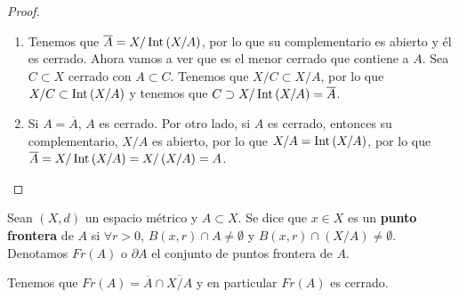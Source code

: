 \begin{proof}
\begin{enumerate}
\item Tenemos que $\displaystyle \overline{A} = X/\operatorname{Int}\left(X/A\right) $, por lo que su complementario es abierto y él es cerrado. Ahora vamos a ver que es el menor cerrado que contiene a $\displaystyle A $. Sea $\displaystyle C \subset X $ cerrado con $\displaystyle A \subset C $. Tenemos que $\displaystyle X/C \subset X/A $, por lo que $\displaystyle X/C \subset \operatorname{Int}\left(X/A\right) $ y tenemos que $\displaystyle C \supset X/\operatorname{Int}\left(X/A\right) = \overline{A} $.
\item Si $\displaystyle A = \overline{A} $, $\displaystyle A  $ es cerrado.
Por otro lado, si $\displaystyle A $ es cerrado, entonces su complementario, $\displaystyle X/A $ es abierto, por lo que $\displaystyle X/A = \operatorname{Int}\left(X/A\right) $, por lo que $\displaystyle \overline{A} = X/\operatorname{Int}\left(X/A\right) = X/\left(X/A\right) = A $.
\end{enumerate}
\end{proof}
\begin{definition}
Sean $\displaystyle \left(X,d\right) $ un espacio métrico y $\displaystyle A \subset X $. Se dice que $\displaystyle x \in X $ es un \textbf{punto frontera} de $\displaystyle A $ si $\displaystyle \forall r > 0 $, $\displaystyle B\left(x,r\right) \cap A \neq \emptyset $ y $\displaystyle B\left(x,r\right) \cap \left(X/A\right) \neq \emptyset $. Denotamos $\displaystyle Fr\left(A\right) $ o $\displaystyle \partial A$ el conjunto de puntos frontera de $\displaystyle A $.
\end{definition}
\begin{observation}
Tenemos que $\displaystyle Fr\left(A\right) = \overline{A} \cap \overline{X/A} $ y en particular $\displaystyle Fr\left(A\right) $ es cerrado.
\end{observation}

